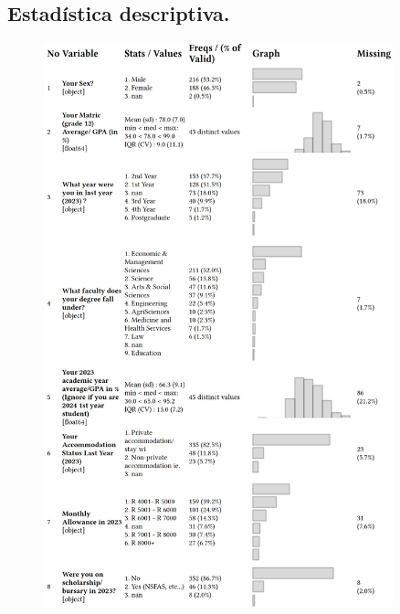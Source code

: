 \documentclass[a4paper,12pt]{article}
\begin{document}
\subsection{Estadística descriptiva.}
\begin{figure}[H]
  \centering
  \includegraphics[width=0.9\textwidth]{Tabla1.png}
\end{figure}
\end{document}
